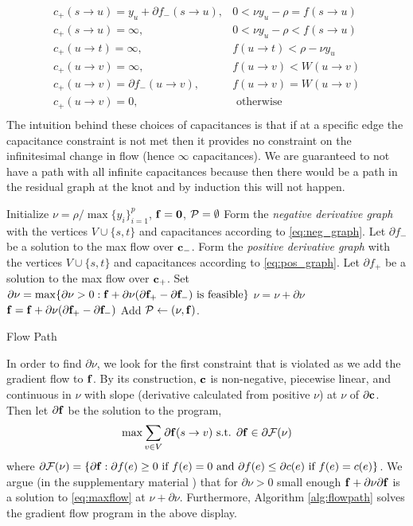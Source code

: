 \begin{equation}
\label{eq:pos_graph}
\begin{array}{ll}
c_+(s \to u) = y_u + \partial f_-(s \to u), &0 < \nu y_u - \rho = f(s \to u)\\
c_+(s \to u) = \infty, &0 < \nu y_u - \rho < f(s \to u)\\
c_+(u \to t) = \infty, &f(u \to t) < \rho - \nu y_u\\
c_+(u \to v) = \infty, &f(u \to v) < W(u \to v)\\
c_+(u \to v) = \partial f_-(u \to v), &f(u \to v) = W(u \to v)\\
c_+(u \to v) = 0, &\textrm{ otherwise}\\
\end{array}
\end{equation}
The intuition behind these choices of capacitances is that if at a specific edge the capacitance constraint is not met then it provides no constraint on the infinitesimal change in flow (hence $\infty$ capacitances).
We are guaranteed to not have a path with all infinite capacitances because then there would be a path in the residual graph at the knot and by induction this will not happen.

\begin{algorithm}
\begin{algorithmic}
\STATE Initialize $\nu = \rho / \max\{y_i\}_{i = 1}^p$, $\mathbf{f} = {\bf 0}$, $\mathcal{P} = \emptyset$
\WHILE{$\nu < \infty$}
\STATE Form the {\em negative derivative graph} with the vertices $V \cup \{s,t\}$ and capacitances according to \eqref{eq:neg_graph}.
\STATE Let $\partial f_-$ be a solution to the max flow over $\mathbf{c}_-$.
\STATE Form the {\em positive derivative graph} with the vertices $V \cup \{s,t\}$ and capacitances according to \eqref{eq:pos_graph}.
\STATE Let $\partial f_+$ be a solution to the max flow over $\mathbf{c}_+$.
\STATE Set $\partial \nu = \max \{ \partial \nu > 0 : \mathbf{f} + \partial \nu ( \partial \mathbf{f}_+ - \partial \mathbf{f}_-) \textrm{ is feasible} \}$
\STATE $\nu = \nu + \partial \nu$
\STATE $\mathbf{f} = \mathbf{f} + \partial \nu (\partial \mathbf{f}_+ - \partial \mathbf{f}_-)$
\STATE Add $\mathcal{P} \leftarrow (\nu, \mathbf{f})$.
\ENDWHILE
\end{algorithmic}
\caption{Flow Path}
\label{alg:flowpath}
\end{algorithm}

In order to find $\partial \nu$, we look for the first constraint that is violated as we add the gradient flow to $\mathbf{f}$.
By its construction, $\mathbf{c}$ is non-negative, piecewise linear, and continuous in $\nu$ with slope (derivative calculated from positive $\nu$) at $\nu$ of $\partial \mathbf{c}$.
Then let $\partial \mathbf{f}$ be the solution to the program,
\[
\max \sum_{v \in V} \partial \mathbf{f}(s \to v) \textrm{ s.t. } \partial \mathbf{f} \in \partial \mathcal{F}(\nu)
\]
where $\partial \mathcal{F}(\nu) = \{ \partial \mathbf{f} : \partial f(e) \ge 0 \textrm{ if } f(e) = 0 \textrm{ and } \partial f(e) \le \partial c(e)\textrm{ if } f(e) = c(e) \}$. 
We argue (in the supplementary material \cite{sharpnack2013path}) that for $\partial \nu >0$ small enough $\mathbf{f} + \partial \nu \partial \mathbf{f}$ is a solution to \eqref{eq:maxflow} at $\nu + \partial \nu$.
Furthermore, Algorithm \ref{alg:flowpath} solves the gradient flow program in the above display.

